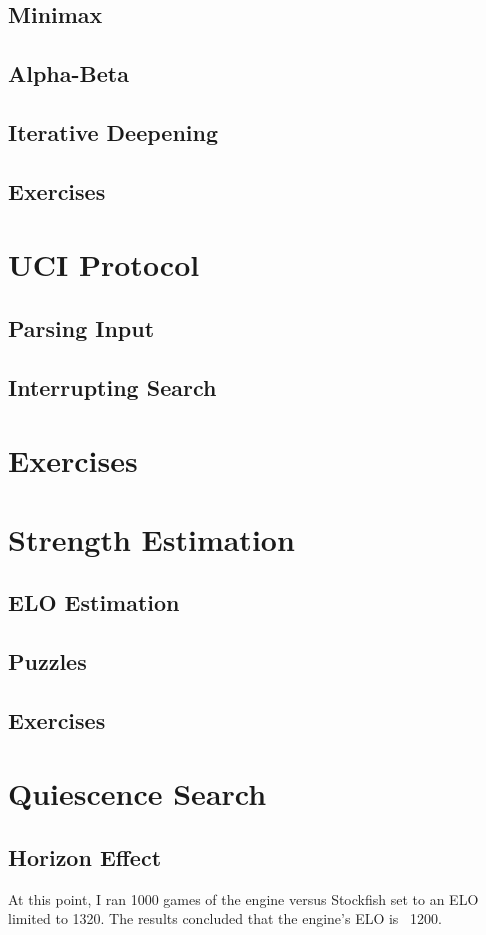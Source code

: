 \documentclass{article}
\begin{document}
\subsection{Minimax}
\subsection{Alpha-Beta}
\subsection{Iterative Deepening}
\subsection{Exercises}

\section{UCI Protocol}
\subsection{Parsing Input}
\subsection{Interrupting Search}
\section{Exercises}

\section{Strength Estimation}
\subsection{ELO Estimation}
\subsection{Puzzles}
\subsection{Exercises}

\section{Quiescence Search}

\subsection{Horizon Effect}
At this point, I ran 1000 games of the engine versus Stockfish set to an ELO limited to 1320. The results concluded that the engine's ELO is ~1200.
\end{document}
